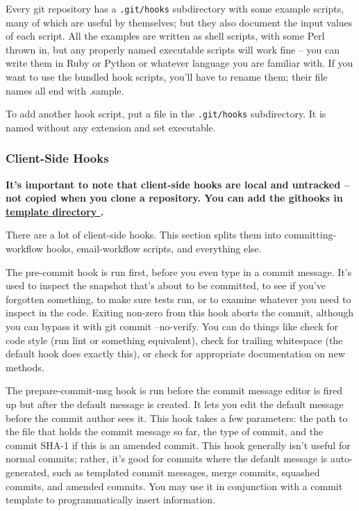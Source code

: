 Every git repository has a \texttt{.git/hooks} subdirectory with some example scripts, many of which are useful by themselves; but they also document the input values of each script. All the examples are written as shell scripts, with some Perl thrown in, but any properly named executable scripts will work fine – you can write them in Ruby or Python or whatever language you are familiar with. If you want to use the bundled hook scripts, you’ll have to rename them; their file names all end with .sample.

To add another hook script, put a file in the \texttt{.git/hooks} subdirectory. It is named without any extension and set executable.

\subsubsection{Client-Side Hooks}%


\textbf{It’s important to note that client-side hooks are local and untracked -- not copied when you clone a repository. You can add the githooks in \href{https://git-scm.com/docs/git-init\#\_template\_directory}{template directory }.}


There are a lot of client-side hooks. This section splits them into committing-workflow hooks, email-workflow scripts, and everything else.




The pre-commit hook is run first, before you even type in a commit message. It’s used to inspect the snapshot that’s about to be committed, to see if you’ve forgotten something, to make sure tests run, or to examine whatever you need to inspect in the code. Exiting non-zero from this hook aborts the commit, although you can bypass it with git commit --no-verify. You can do things like check for code style (run lint or something equivalent), check for trailing whitespace (the default hook does exactly this), or check for appropriate documentation on new methods.

The prepare-commit-msg hook is run before the commit message editor is fired up but after the default message is created. It lets you edit the default message before the commit author sees it. This hook takes a few parameters: the path to the file that holds the commit message so far, the type of commit, and the commit SHA-1 if this is an amended commit. This hook generally isn’t useful for normal commits; rather, it’s good for commits where the default message is auto-generated, such as templated commit messages, merge commits, squashed commits, and amended commits. You may use it in conjunction with a commit template to programmatically insert information.

